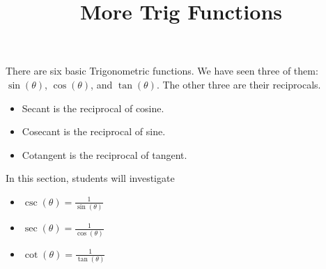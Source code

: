 \documentclass{ximera}
\title{More Trig Functions}
\begin{document}
\begin{abstract}
%
\end{abstract}
\maketitle



There are six basic Trigonometric functions.  We have seen three of them: $\sin(\theta)$, $\cos(\theta)$, and $\tan(\theta)$. The other three are their reciprocals.


\begin{itemize}
\item Secant is the reciprocal of cosine.
\item Cosecant is the reciprocal of sine.
\item Cotangent is the reciprocal of tangent.
\end{itemize}







\begin{sectionOutcomes}
In this section, students will investigate

\begin{itemize}
\item $\csc(\theta) = \frac{1}{\sin(\theta)}$
\item $\sec(\theta) = \frac{1}{\cos(\theta)}$
\item $\cot(\theta) = \frac{1}{\tan(\theta)}$
\end{itemize}
\end{sectionOutcomes}
\end{document}
